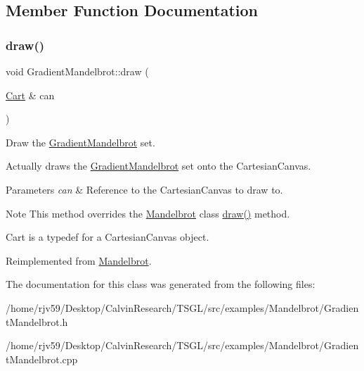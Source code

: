 \subsection{Member Function Documentation}
\mbox{\label{class_gradient_mandelbrot_a1d4aa3e44d7d1c2241545b60c79985df}} 
\subsubsection{\texorpdfstring{draw()}{draw()}}
{\footnotesize\ttfamily void Gradient\+Mandelbrot\+::draw (\begin{DoxyParamCaption}\item[{\hyperlink{classtsgl_1_1_cartesian_canvas}{Cart} \&}]{can }\end{DoxyParamCaption})\hspace{0.3cm}{\ttfamily [virtual]}}



Draw the \hyperlink{class_gradient_mandelbrot}{Gradient\+Mandelbrot} set. 

Actually draws the \hyperlink{class_gradient_mandelbrot}{Gradient\+Mandelbrot} set onto the Cartesian\+Canvas. 
\begin{DoxyParams}{Parameters}
{\em can} & Reference to the Cartesian\+Canvas to draw to. \\
\hline
\end{DoxyParams}
\begin{DoxyNote}{Note}
This method overrides the \hyperlink{class_mandelbrot}{Mandelbrot} class\textquotesingle{} \hyperlink{class_gradient_mandelbrot_a1d4aa3e44d7d1c2241545b60c79985df}{draw()} method. 

Cart is a typedef for a Cartesian\+Canvas object. 
\end{DoxyNote}


Reimplemented from \hyperlink{class_mandelbrot_ab7918e4de8f00f73290f110ca7a6cffd}{Mandelbrot}.



The documentation for this class was generated from the following files\+:\begin{DoxyCompactItemize}
\item 
/home/rjv59/\+Desktop/\+Calvin\+Research/\+T\+S\+G\+L/src/examples/\+Mandelbrot/Gradient\+Mandelbrot.\+h\item 
/home/rjv59/\+Desktop/\+Calvin\+Research/\+T\+S\+G\+L/src/examples/\+Mandelbrot/Gradient\+Mandelbrot.\+cpp\end{DoxyCompactItemize}
